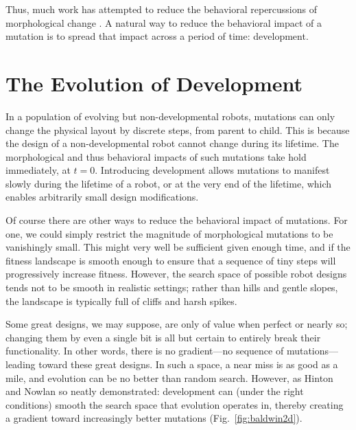 Thus, much work has attempted to reduce the behavioral repercussions of morphological change \cite{cheney2018scalable}.
A natural way
to reduce the behavioral impact of a mutation 
is to spread that impact across a period of time: development.



\section{The Evolution of Development}


In a population of evolving but non-developmental robots, mutations can only change the physical layout by discrete steps, from parent to child.
This is because the design of a non-developmental robot cannot change during its lifetime.
The morphological and thus behavioral impacts of such mutations take hold immediately, at $t=0$.
Introducing development allows mutations to manifest slowly during the lifetime of a robot, or at the very end of the lifetime, which enables arbitrarily small design modifications.

Of course there are other ways to reduce the behavioral impact of mutations.
For one, we could simply restrict the magnitude of morphological mutations to be vanishingly small.
This might very well be sufficient given enough time, and if the fitness landscape is smooth enough to ensure that a sequence of tiny steps will progressively increase fitness.
However, the search space of possible robot designs tends not to be smooth in realistic settings; rather than hills and gentle slopes, the landscape is typically full of cliffs and harsh spikes. 

Some great designs, we may suppose, are only of value when perfect or nearly so; changing them by even a single bit is all but certain to entirely break their functionality.
In other words, there is no gradient---no sequence of mutations---leading toward these great designs.
In such a space, a near miss is as good as a mile, and evolution can be no better than random search.
However, as Hinton and Nowlan \cite{hinton1987learning} so neatly demonstrated: development can (under the right conditions) smooth the search space that evolution operates in, thereby creating a gradient toward increasingly better mutations (Fig.~\ref{fig:baldwin2d}).


